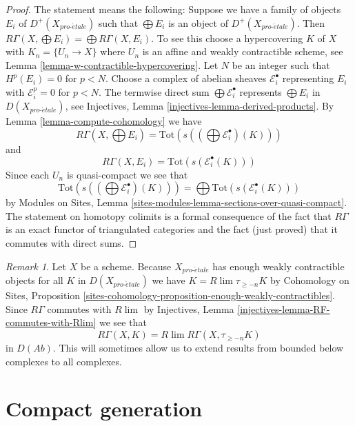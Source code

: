 \documentclass{stacks-project}
\theoremstyle{plain}
\theoremstyle{definition}
\theoremstyle{remark}
\newtheorem{remark}[subsection]{Remark}
\numberwithin{equation}{subsection}
\def\lim{\mathop{\mathrm{lim}}\nolimits}
\def\proetale{{pro\text{-}\acute{e}tale}}
\begin{document}
\begin{proof}
The statement means the following: Suppose we have a family of objects
$E_i$ of $D^+(X_\proetale)$ such that $\bigoplus E_i$ is an object
of $D^+(X_\proetale)$. Then
$R\Gamma(X, \bigoplus E_i) = \bigoplus R\Gamma(X, E_i)$.
To see this choose a hypercovering $K$ of $X$ with $K_n = \{U_n \to X\}$
where $U_n$ is an affine and weakly contractible scheme, see
Lemma \ref{lemma-w-contractible-hypercovering}.
Let $N$ be an integer such that $H^p(E_i) = 0$ for $p < N$.
Choose a complex of abelian sheaves $\mathcal{E}_i^\bullet$
representing $E_i$ with $\mathcal{E}_i^p = 0$ for $p < N$.
The termwise direct sum $\bigoplus \mathcal{E}_i^\bullet$ represents
$\bigoplus E_i$ in $D(X_\proetale)$, see
Injectives, Lemma \ref{injectives-lemma-derived-products}.
By Lemma \ref{lemma-compute-cohomology} we have
$$
R\Gamma(X, \bigoplus E_i) =
\text{Tot}(s((\bigoplus \mathcal{E}^\bullet_i)(K)))
$$
and
$$
R\Gamma(X, E_i) = \text{Tot}(s(\mathcal{E}^\bullet_i(K)))
$$
Since each $U_n$ is quasi-compact we see that
$$
\text{Tot}(s((\bigoplus \mathcal{E}^\bullet_i)(K))) =
\bigoplus \text{Tot}(s(\mathcal{E}^\bullet_i(K)))
$$
by Modules on Sites, Lemma
\ref{sites-modules-lemma-sections-over-quasi-compact}.
The statement on homotopy colimits is a formal consequence of the fact
that $R\Gamma$ is an exact functor of triangulated categories and the
fact (just proved) that it commutes with direct sums.
\end{proof}

\begin{remark}
\label{remark-extend-to-all}
Let $X$ be a scheme. Because $X_\proetale$ has enough weakly contractible
objects for all $K$ in $D(X_\proetale)$ we have $K = R\lim \tau_{\geq -n}K$
by
Cohomology on Sites, Proposition
\ref{sites-cohomology-proposition-enough-weakly-contractibles}.
Since $R\Gamma$ commutes with $R\lim$ by
Injectives, Lemma \ref{injectives-lemma-RF-commutes-with-Rlim}
we see that
$$
R\Gamma(X, K) = R\lim R\Gamma(X, \tau_{\geq -n}K)
$$
in $D(\textit{Ab})$. This will sometimes allow us to extend results from
bounded below complexes to all complexes.
\end{remark}







\section{Compact generation}
\label{section-compact-generation}
\end{document}
